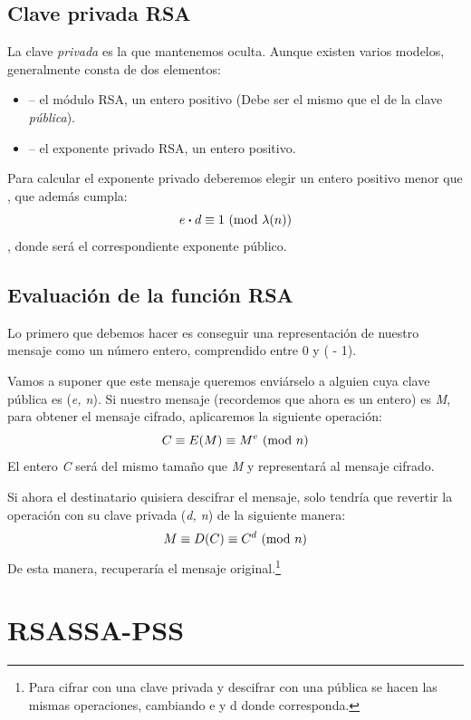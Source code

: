  \subsection{Clave privada RSA}

 La clave \emph{privada} es la que mantenemos oculta. Aunque existen varios modelos, generalmente consta de dos elementos:
 \begin{itemize}
 \item {} -- el módulo RSA, un entero positivo (Debe ser el mismo que el de la clave \emph{pública}).
 \item {} -- el exponente privado RSA, un entero positivo.
 \end{itemize}

 Para calcular el exponente privado  deberemos elegir un entero positivo menor que , que además cumpla:
 \[ e \boldsymbol{\cdot} d \equiv 1 \ (\mathrm{mod}\ \lambda(n)) \]
 , donde  será el correspondiente exponente público. \emph{\parencite{Reference11}}

 \subsection{Evaluación de la función RSA}

 Lo primero que debemos hacer es conseguir una representación de nuestro mensaje como un número entero, comprendido entre 0 y ( - 1).

 Vamos a suponer que este mensaje queremos enviárselo a alguien cuya clave pública es (\emph{e, n}).
 Si nuestro mensaje (recordemos que ahora es un entero) es \emph{M}, para obtener el mensaje cifrado, aplicaremos la siguiente operación:
 \[ C \equiv E(M) \equiv M^e \ (\mathrm{mod}\ n) \]
 El entero \emph{C} será del mismo tamaño que \emph{M} y representará al mensaje cifrado.

 Si ahora el destinatario quisiera descifrar el mensaje, solo tendría que revertir la operación con su clave privada (\emph{d, n}) de la siguiente manera:
 \[ M \equiv D(C) \equiv C^d \ (\mathrm{mod}\ n) \]
 De esta manera, recuperaría el mensaje original.\footnote{Para cifrar con una clave privada y descifrar con una pública se hacen las mismas operaciones, cambiando e y d donde corresponda.} \emph{\parencite{Reference12}}


 \section{RSASSA-PSS}

